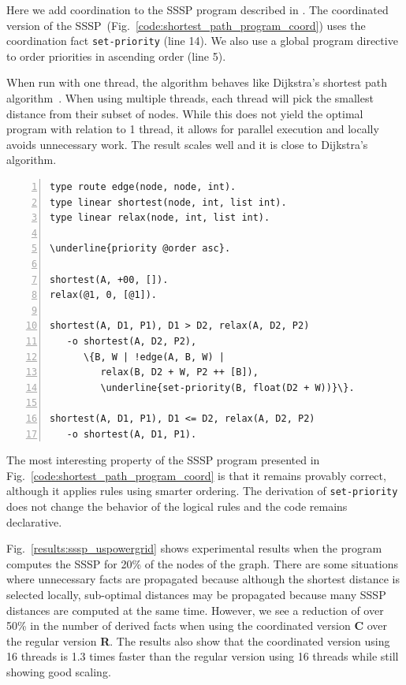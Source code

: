Here we add coordination to the SSSP program described in .
The coordinated version of the
SSSP~(Fig.~\ref{code:shortest_path_program_coord}) uses the coordination fact
\texttt{set-priority} (line 14). We also use a global program directive to order
priorities in ascending order (line 5).

When run with one thread, the algorithm behaves like
Dijkstra's shortest path algorithm~\cite{Dijkstra}. When using multiple
threads, each thread will pick the smallest distance from their subset of nodes.
While this does not yield the optimal program with relation to 1 thread, it
allows for parallel execution and locally avoids unnecessary work. The result
scales well and it is close to Dijkstra's algorithm.

\begin{topfig}
\scriptsize\begin{Verbatim}[numbers=left,commandchars=\\\{\}]
type route edge(node, node, int).
type linear shortest(node, int, list int).
type linear relax(node, int, list int).

\underline{priority @order asc}.

shortest(A, +00, []).
relax(@1, 0, [@1]).

shortest(A, D1, P1), D1 > D2, relax(A, D2, P2)
   -o shortest(A, D2, P2),
      \{B, W | !edge(A, B, W) |
         relax(B, D2 + W, P2 ++ [B]),
         \underline{set-priority(B, float(D2 + W))}\}.

shortest(A, D1, P1), D1 <= D2, relax(A, D2, P2)
   -o shortest(A, D1, P1).
\end{Verbatim}
\end{topfig}
\normalsize

The most interesting property of the SSSP program presented in
Fig.~\ref{code:shortest_path_program_coord} is that it remains provably correct,
although it applies rules using smarter ordering. The derivation of
\texttt{set-priority} does not change the behavior of the logical rules and the
code remains declarative.

Fig.~\ref{results:sssp_uspowergrid} shows experimental results when the
program computes the SSSP for 20\% of the nodes of the graph.
There are some situations where unnecessary facts are propagated
because although the shortest distance is selected locally, sub-optimal distances may be
propagated because many SSSP distances are computed at the same time.
However, we see a reduction of over 50\% in the number of
derived facts when using the coordinated version \textbf{C} over the regular
version \textbf{R}. The results also show that the coordinated
version using 16 threads is 1.3 times faster than the regular version using 16
threads while still showing good scaling.


